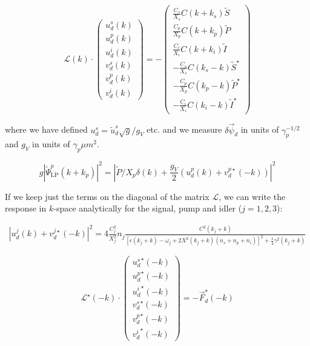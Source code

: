 \documentclass[a4paper,prb,10pt,aps,twocolumn]{revtex4-1}
\begin{document}
\begin{equation}
  \label{eq:7}
   \mathcal{L}(k) \cdot \left(\begin{array}{c}
   u^s_d(k)\\
   u^p_d(k)\\
   u^i_d(k)\\
   v^s_d(k)\\
   v^p_d(k)\\
   v^i_d(k)
   \end{array}\right)=
   -\left(\begin{array}{c}
   \frac{C_{s}}{X_s}C(k+k_{s})\tilde{S}\\
   \frac{C_{p}}{X_p}C(k+k_{p})\tilde{P}\\
   \frac{C_{i}}{X_i}C(k+k_{i})\tilde{I}\\
   -\frac{C_{s}}{X_s}C(k_{s}-k)\tilde{S}^{\star}\\
   -\frac{C_{p}}{X_p}C(k_{p}-k)\tilde{P}^{\star}\\
   -\frac{C_{i}}{X_i}C(k_{i}-k)\tilde{I}^{\star}
   \end{array}\right)
\end{equation}

where we have defined $u_d^s = \tilde{u}_d^s \sqrt{g}/g_V$ etc.
and we measure $\delta\vec{\psi}_{d}$ in units of
$\gamma_p^{-1/2}$ and $g_V$ in units of
$\gamma_p \mu m^2$.

\begin{equation}
  \label{eq:8}
g \left|\tilde{\Psi}_{\text{LP}}^{p}\left(k+k_{p}\right)\right|^{2}= \left|\tilde{P}/X_{p}\delta(k)+\frac{g_{V}}{2}\left(u_{d}^{p}(k)+v_{d}^{p\star}(-k)\right)\right|^{2}
\end{equation}


If we keep just the terms on the diagonal of the matrix
$\mathcal{L}$, we can write the response in $k$-space
analytically for the signal, pump and idler ($j=1,2,3$):

\begin{widetext}
\begin{multline}
  \label{eq:9}
\left|u_{d}^{j}(k)+v_{d}^{j\star}(-k)\right|^{2}=4\frac{C_{j}^{2}}{X_{j}^{2}}n_{j}\frac{C^{2}(k_{j}+k)}{\left[\epsilon\left(k_{j}+k\right)-\omega_{j}+2 X^2(k_{j}+k) \left(n_{s}+n_{p}+n_{i}\right)\right]^{2}+\frac{1}{4}\gamma^{2}\left(k_{j}+k\right)}  
\end{multline}
\end{widetext}

\begin{equation}
  \label{eq:10}
   \mathcal{L}^{\star}(-k) \cdot \left(\begin{array}{c}
   {u_d^s}^{\star}(-k)\\
   {u_d^p}^{\star}(-k)\\
   {u_d^i}^{\star}(-k)\\
   {v_d^s}^{\star}(-k)\\
   {v_d^p}^{\star}(-k)\\
   {v_d^i}^{\star}(-k)
   \end{array}\right) = - \vec{F}_{d}^{\star}(-k)
\end{equation}
\end{document}
